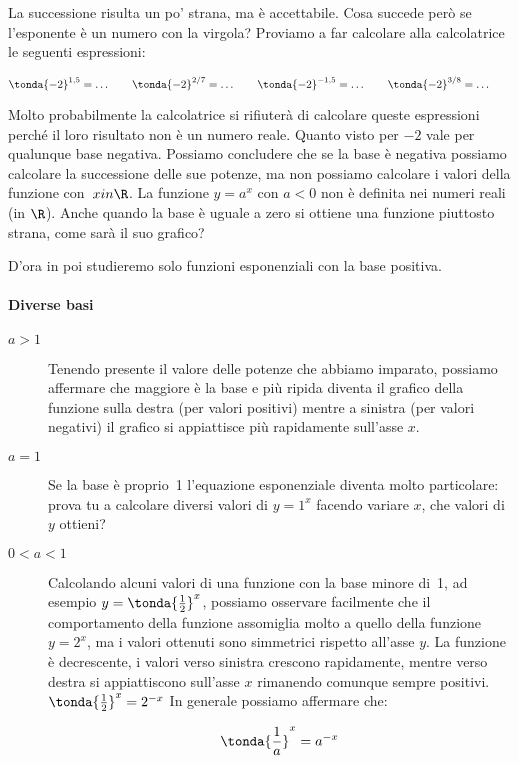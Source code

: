 La successione risulta un po' strana, ma è accettabile. Cosa succede però se 
l'esponente è un numero con la virgola? Proviamo a far calcolare alla 
calcolatrice le seguenti espressioni:

\[\tonda{-2}^{1,5}= \dots \qquad \tonda{-2}^{2/7}= \dots \qquad 
 \tonda{-2}^{-1,5}= \dots \qquad \tonda{-2}^{3/8}= \dots \qquad 
\]

Molto probabilmente la calcolatrice si rifiuterà di calcolare queste 
espressioni perché il loro risultato non è un numero reale. 
Quanto visto per \(-2\) vale per qualunque base negativa.
Possiamo concludere che se la base è negativa possiamo calcolare la successione 
delle sue potenze, ma non possiamo calcolare i valori della funzione 
con~\(x in \R\). 
La funzione \(y=a^x \text{ con } a<0\) non è definita nei numeri reali 
(in \(\R\)).
Anche quando la base è uguale a zero si ottiene una funzione piuttosto strana, 
come sarà il suo grafico?

D'ora in poi studieremo solo funzioni esponenziali con la base positiva.

\paragraph{Diverse basi}
\label{par:esplog_diversebasi}

\begin{description}
 \item [\(a>1\)]
Tenendo presente il valore delle potenze che abbiamo imparato, possiamo 
affermare che maggiore è la base e più ripida diventa il grafico della funzione 
sulla destra (per valori positivi) mentre a sinistra (per valori negativi) il 
grafico si appiattisce più rapidamente sull'asse \(x\).
 \item [\(a=1\)]
Se la base è proprio~1 l'equazione esponenziale 
diventa molto particolare: prova tu a calcolare diversi valori di \(y=1^x\) 
facendo variare \(x\), che valori di \(y\) ottieni?
 \item [\(0<a<1\)]
Calcolando alcuni valori di una funzione con la base minore di~1, 
ad esempio \(y=\tonda{\frac{1}{2}}^x\), possiamo osservare facilmente che il 
comportamento della funzione assomiglia molto a quello della funzione
\(y=2^x\), ma i valori ottenuti sono simmetrici rispetto all'asse \(y\). 
La funzione è decrescente, i valori verso sinistra crescono rapidamente, mentre 
verso destra si appiattiscono sull'asse \(x\) rimanendo comunque sempre 
positivi.
\(\tonda{\frac{1}{2}}^x = 2^{-x}\)
In generale possiamo affermare che:

\[\tonda{\frac{1}{a}}^x = a^{-x}\]
\end{description}

